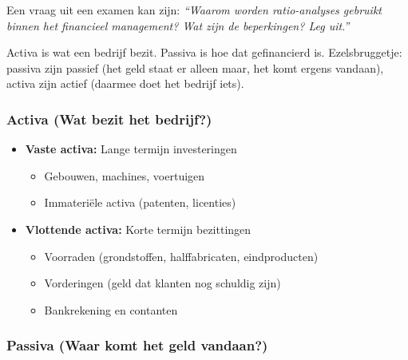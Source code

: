 \documentclass[a4paper,11pt]{article}
\begin{document}
\begin{examenbox}
    Een vraag uit een examen kan zijn: \textit{``Waarom worden ratio-analyses gebruikt binnen het financieel
        management? Wat zijn de beperkingen? Leg uit.''}
\end{examenbox}


Activa is wat een bedrijf bezit.
Passiva is hoe dat gefinancierd is.
Ezelsbruggetje: passiva zijn passief (het geld staat er alleen maar, het komt ergens vandaan),
activa zijn actief (daarmee doet het bedrijf iets).



\begin{conceptbox}
    \subsubsection{Activa (Wat bezit het bedrijf?)}
    \begin{itemize}
        \item \textbf{Vaste activa:} Lange termijn investeringen
              \begin{itemize}
                  \item Gebouwen, machines, voertuigen
                  \item Immateriële activa (patenten, licenties)
              \end{itemize}
        \item \textbf{Vlottende activa:} Korte termijn bezittingen
              \begin{itemize}
                  \item Voorraden (grondstoffen, halffabricaten, eindproducten)
                  \item Vorderingen (geld dat klanten nog schuldig zijn)
                  \item Bankrekening en contanten
              \end{itemize}
    \end{itemize}

    \subsubsection{Passiva (Waar komt het geld vandaan?)}


\end{conceptbox}
\end{document}
